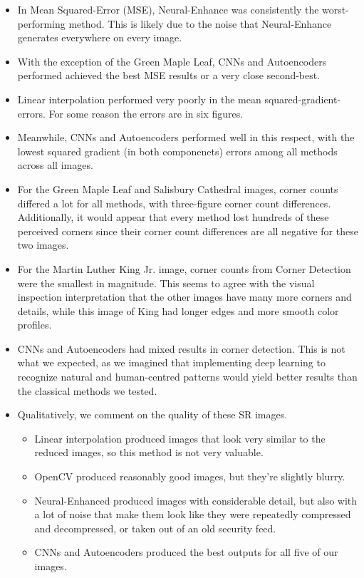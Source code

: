 \documentclass[letterpaper,12pt]{article}
\begin{document}
\begin{itemize}
    \item In Mean Squared-Error (MSE), Neural-Enhance was consistently the worst-performing method. This is likely due to the noise that Neural-Enhance generates everywhere on every image.
    \item With the exception of the Green Maple Leaf, CNNs and Autoencoders performed achieved the best MSE results or a very close second-best.
    \item Linear interpolation performed very poorly in the mean squared-gradient-errors. For some reason the errors are in six figures.
    \item Meanwhile, CNNs and Autoencoders performed well in this respect, with the lowest squared gradient (in both componenets) errors among all methods across all images.
    \item For the Green Maple Leaf and Salisbury Cathedral images, corner counts differed a lot for all methods, with three-figure corner count differences. Additionally, it would appear that every method lost hundreds of these perceived corners since their corner count differences are all negative for these two images.
    \item For the Martin Luther King Jr. image, corner counts from Corner Detection were the smallest in magnitude. This seems to agree with the visual inspection interpretation that the other images have many more corners and details, while this image of King had longer edges and more smooth color profiles.
    \item CNNs and Autoencoders had mixed results in corner detection. This is not what we expected, as we imagined that implementing deep learning to recognize natural and human-centred patterns would yield better results than the classical methods we tested.
    \item Qualitatively, we comment on the quality of these SR images.
        \begin{itemize}
            \item Linear interpolation produced images that look very similar to the reduced images, so this method is not very valuable.
            \item OpenCV produced reasonably good images, but they're slightly blurry.
            \item Neural-Enhanced produced images with considerable detail, but also with a lot of noise that make them look like they were repeatedly compressed and decompressed, or taken out of an old security feed.
            \item CNNs and Autoencoders produced the best outputs for all five of our images.
        \end{itemize}
\end{itemize}
\end{document}
